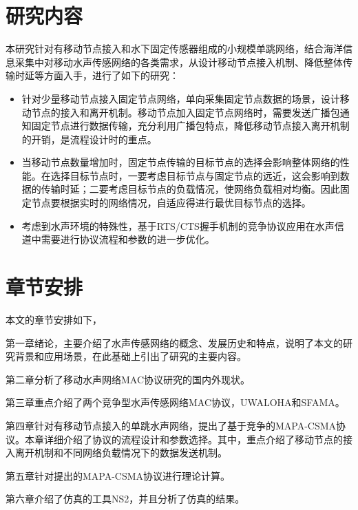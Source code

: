 \section{研究内容}
本研究针对有移动节点接入和水下固定传感器组成的小规模单跳网络，结合海洋信息采集中对移动水声传感网络的各类需求，从设计移动节点接入机制、降低整体传输时延等方面入手，进行了如下的研究：
\begin{itemize}
	\item 针对少量移动节点接入固定节点网络，单向采集固定节点数据的场景，设计移动节点的接入和离开机制。移动节点加入固定节点网络时，需要发送广播包通知固定节点进行数据传输，充分利用广播包特点，降低移动节点接入离开机制的开销，是流程设计时的重点。
	\item 当移动节点数量增加时，固定节点传输的目标节点的选择会影响整体网络的性能。在选择目标节点时，一要考虑目标节点与固定节点的远近，这会影响到数据的传输时延；二要考虑目标节点的负载情况，使网络负载相对均衡。因此固定节点要根据实时的网络情况，自适应得进行最优目标节点的选择。
	\item 考虑到水声环境的特殊性，基于RTS/CTS握手机制的竞争协议应用在水声信道中需要进行协议流程和参数的进一步优化。
\end{itemize}

\section{章节安排}
本文的章节安排如下，

第一章绪论，主要介绍了水声传感网络的概念、发展历史和特点，说明了本文的研究背景和应用场景，在此基础上引出了研究的主要内容。

第二章分析了移动水声网络MAC协议研究的国内外现状。

第三章重点介绍了两个竞争型水声传感网络MAC协议，UWALOHA和SFAMA。

第四章针对有移动节点接入的单跳水声网络，提出了基于竞争的MAPA-CSMA协议。本章详细介绍了协议的流程设计和参数选择。其中，重点介绍了移动节点的接入离开机制和不同网络负载情况下的数据发送机制。

第五章针对提出的MAPA-CSMA协议进行理论计算。

第六章介绍了仿真的工具NS2，并且分析了仿真的结果。

\endinput